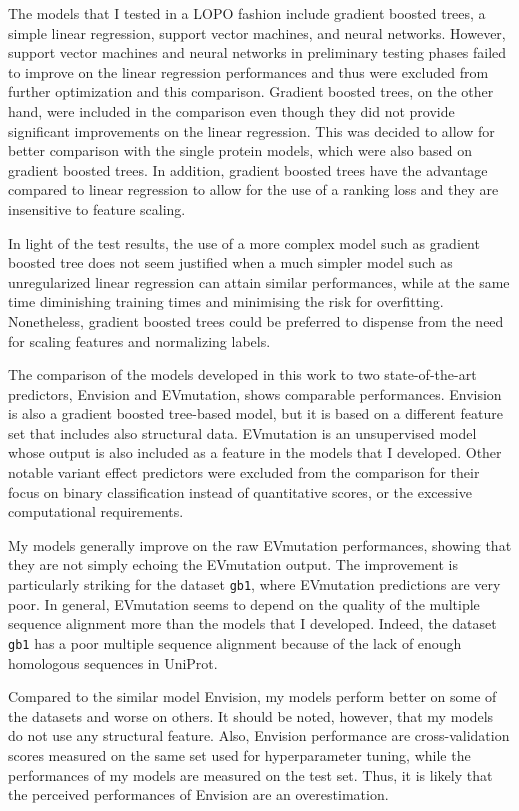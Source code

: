 The models that I tested in a LOPO fashion include gradient boosted trees, a simple linear regression, support vector machines, and neural networks.
However, support vector machines and neural networks in preliminary testing phases failed to improve on the linear regression performances and thus were excluded from further optimization and this comparison.
Gradient boosted trees, on the other hand, were included in the comparison even though they did not provide significant improvements on the linear regression.
This was decided to allow for better comparison with the single protein models, which were also based on gradient boosted trees.
In addition, gradient boosted trees have the advantage compared to linear regression to allow for the use of a ranking loss and they are insensitive to feature scaling.

In light of the test results, the use of a more complex model such as gradient boosted tree does not seem justified when a much simpler model such as unregularized linear regression can attain similar performances, while at the same time diminishing training times and minimising the risk for overfitting.
Nonetheless, gradient boosted trees could be preferred to dispense from the need for scaling features and normalizing labels.

The comparison of the models developed in this work to two state-of-the-art predictors, Envision and EVmutation, shows comparable performances.
Envision is also a gradient boosted tree-based model, but it is based on a different feature set that includes also structural data.
EVmutation is an unsupervised model whose output is also included as a feature in the models that I developed.
Other notable variant effect predictors were excluded from the comparison for their focus on binary classification instead of quantitative scores, or the excessive computational requirements.

My models generally improve on the raw EVmutation performances, showing that they are not simply echoing the EVmutation output.
The improvement is particularly striking for the dataset \texttt{gb1}, where EVmutation predictions are very poor.
In general, EVmutation seems to depend on the quality of the multiple sequence alignment more than the models that I developed.
Indeed, the dataset \texttt{gb1} has a poor multiple sequence alignment because of the lack of enough homologous sequences in UniProt.

Compared to the similar model Envision, my models perform better on some of the datasets and worse on others.
It should be noted, however, that my models do not use any structural feature.
Also, Envision performance are cross-validation scores measured on the same set used for hyperparameter tuning, while the performances of my models are measured on the test set.
Thus, it is likely that the perceived performances of Envision are an overestimation.

